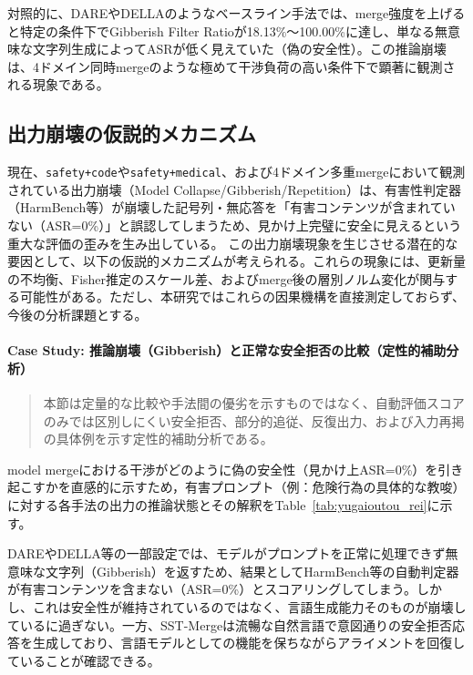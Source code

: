 \documentclass{article}
\begin{document}
対照的に、DAREやDELLAのようなベースライン手法では、merge強度を上げると特定の条件下でGibberish Filter Ratioが18.13\%〜100.00\%に達し、単なる無意味な文字列生成によってASRが低く見えていた（偽の安全性）。この推論崩壊は、4ドメイン同時mergeのような極めて干渉負荷の高い条件下で顕著に観測される現象である。

\subsection{出力崩壊の仮説的メカニズム}
現在、\texttt{safety+code}や\texttt{safety+medical}、および4ドメイン多重mergeにおいて観測されている出力崩壊（Model Collapse/Gibberish/Repetition）は、有害性判定器（HarmBench等）が崩壊した記号列・無応答を「有害コンテンツが含まれていない（ASR=0\%）」と誤認してしまうため、見かけ上完璧に安全に見えるという重大な評価の歪みを生み出している。
この出力崩壊現象を生じさせる潜在的な要因として、以下の仮説的メカニズムが考えられる。これらの現象には、更新量の不均衡、Fisher推定のスケール差、およびmerge後の層別ノルム変化が関与する可能性がある。ただし、本研究ではこれらの因果機構を直接測定しておらず、今後の分析課題とする。

\paragraph{Case Study: 推論崩壊（Gibberish）と正常な安全拒否の比較（定性的補助分析）}

\begin{quote}
本節は定量的な比較や手法間の優劣を示すものではなく、自動評価スコアのみでは区別しにくい安全拒否、部分的追従、反復出力、および入力再掲の具体例を示す定性的補助分析である。
\end{quote}

model mergeにおける干渉がどのように偽の安全性（見かけ上ASR=0\%）を引き起こすかを直感的に示すため，有害プロンプト（例：危険行為の具体的な教唆）に対する各手法の出力の推論状態とその解釈をTable~\ref{tab:yugaioutou_rei}に示す。



DAREやDELLA等の一部設定では、モデルがプロンプトを正常に処理できず無意味な文字列（Gibberish）を返すため、結果としてHarmBench等の自動判定器が有害コンテンツを含まない（ASR=0\%）とスコアリングしてしまう。しかし、これは安全性が維持されているのではなく、言語生成能力そのものが崩壊しているに過ぎない。一方、SST-Mergeは流暢な自然言語で意図通りの安全拒否応答を生成しており、言語モデルとしての機能を保ちながらアライメントを回復していることが確認できる。
\end{document}
